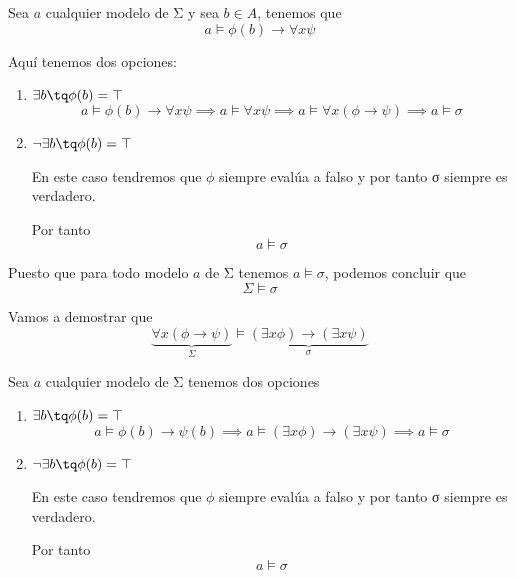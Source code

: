 \begin{problem}
Sea $a$ cualquier modelo de Σ y sea $b \in A$, tenemos que
\[a \models \phi(b) \to \forall x \psi \]

Aquí tenemos dos opciones:
\begin{enumerate}
\item $\exists b \tq \phi(b)=\top$
\[a \models \phi(b) \to \forall x \psi \implies a \models \forall x \psi \implies a \models \forall x (\phi \to \psi) \implies a \models σ\]
\item $\neg \exists b \tq \phi(b) = \top$

En este caso tendremos que $\phi$ siempre evalúa a falso y por tanto σ siempre es verdadero.

Por tanto
\[a \models σ\]
\end{enumerate}

Puesto que para todo modelo $a$ de Σ tenemos $a \models σ$, podemos concluir que
\[Σ \models σ\]

\spart

Vamos a demostrar que
\[\underbrace{\forall x (\phi \to \psi)}_{Σ} \models \underbrace{(\exists x  \phi )\to  (\exists x \psi)}_{σ}\]

Sea $a$ cualquier modelo de Σ tenemos dos opciones
\begin{enumerate}
\item $\exists b \tq \phi(b)=\top$
\[a \models \phi(b) \to \psi (b) \implies a \models (\exists x \phi) \to (\exists x \psi) \implies a \models σ\]
\item $\neg \exists b \tq \phi(b) = \top$

En este caso tendremos que $\phi$ siempre evalúa a falso y por tanto σ siempre es verdadero.

Por tanto
\[a \models σ\]
\end{enumerate}
\end{problem}

